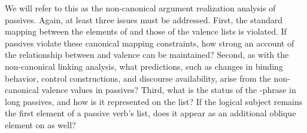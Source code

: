 \documentclass[output=paper,biblatex,babelshorthands,newtxmath,draftmode,colorlinks, citecolor=brown]{langscibook}
\begin{document}

We will refer to this as the non-canonical argument realization analysis of passives. Again, at least three 
issues must be addressed.
First, the standard mapping between the elements of \argst and those of the valence lists is violated.
If passives violate these canonical mapping constraints, how strong an account of the relationship between \argst and valence can be maintained?
Second, as with the non-canonical linking analysis, what predictions, such as changes in binding behavior, control constructions, and discourse availability, arise from the non-canonical valence values in passives?
Third, what is the status of the -phrase in long passives, and how is it represented on the \argst list?  If the logical subject remains the first element of a passive verb's \argst list, does it appear as an additional oblique element on \argst as well? 
\end{document}
